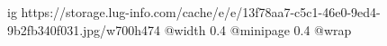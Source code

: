  
 
 
 
 

\ifcmt
  ig https://storage.lug-info.com/cache/e/e/13f78aa7-c5c1-46e0-9ed4-9b2fb340f031.jpg/w700h474
  @width 0.4
  @minipage 0.4
  @wrap \parpic[r]
\fi
